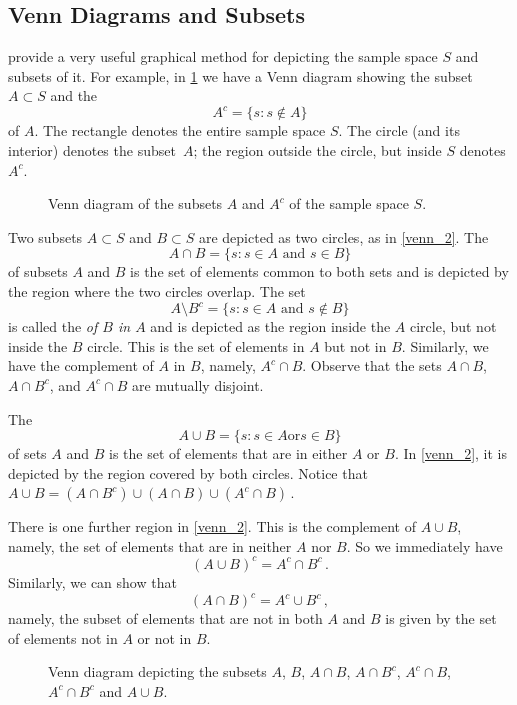 \subsection{Venn Diagrams and Subsets}
 provide a very useful graphical method for depicting the sample space $S$ and subsets of it. For
example, in \ref{venn_1} we have a Venn diagram showing the subset $A \subset S$ and the 
$$
A^c = \{s:s\notin A\}
$$
of $A$. The rectangle denotes the entire sample space $S$. The circle (and its interior) denotes the subset~$A$; the
region outside the circle, but inside $S$ denotes $A^c$.
\begin{figure}[hb]
\caption{Venn diagram of the subsets $A$ and $A^c$ of the sample space $S$.}\label{venn_1}
\end{figure}

Two subsets $A \subset S$ and $B \subset S$ are depicted as two circles, as in \autoref{venn_2}. The
$$
A \cap B = \{s:s \in A \text{ and } s \in B\}
$$
of subsets $A$ and $B$ is the set of elements  common to both sets and is depicted by the region where the two
circles overlap. The set
$$
A \setminus B^c = \{s:s\in A \text{ and } s \notin B\}
$$
is called the  \emph{of $B$ in $A$} and is depicted as the region inside the $A$ circle, but not
inside the $B$ circle. This is the set of elements in   $A$ but not in $B$. Similarly, we have the complement of $A$
in $B$, namely, $A^c \cap B$. Observe that the sets $A\cap B$, $A \cap B^c$, and $A^c \cap B$ are mutually disjoint.

The 
$$
A \cup B = \{ s : s \in A \text{or} s \in B\}
$$
of sets $A$ and $B$ is the set of elements that are in either $A$ or $B$. In \autoref{venn_2}, it is depicted by the
region covered by both circles. Notice that $ A \cup B = \left(A \cap B^c\right) \cup (A \cap B) \cup (A^c \cap B)$\,.


There is one further region in \autoref{venn_2}. This is the complement of $A \cup B$, namely, the set of elements
that
are in neither $A$ nor $B$. So we immediately have
$$
    (A\cup B)^c = A^c \cap B^c\,.
$$
Similarly, we can show that
$$
    (A\cap B)^c = A^c \cup B^c
    \,,
$$
namely, the subset of elements that are not in both $A$ and $B$ is given by the set of elements not in $A$ or not in
$B$.
\begin{figure}[hb]
    \caption{Venn diagram depicting the subsets $A$, $B$, $A\cap B$, $A\cap B^c$, $A^c \cap B$, $A^c \cap B^c$ and $A
    \cup B$.}\label{venn_2}
\end{figure}


